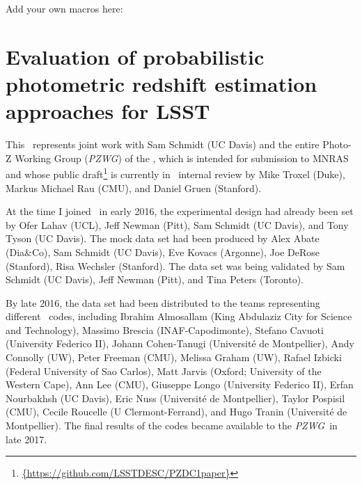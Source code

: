 \renewcommand{\chapid}{pzdc1}


 Add your own macros here:

\newcommand{\kids}{\project{KiDS}}
\newcommand{\hsc}{\project{HSC}}
\newcommand{\wfirst}{\project{WFIRST}}
\newcommand{\buzz}{\project{Buzzard}}
\newcommand{\pzwg}{\textit{PZWG}}

\newcommand{\chisq}{$\chi^{2}$}

\newcommand{\pzcode}[1]{\texttt{#1}}
\newcommand{\annz}{\pzcode{ANNz2}}
\newcommand{\bpz}{\pzcode{BPz}}
\newcommand{\cmnn}{\pzcode{CMNN}}
\newcommand{\delight}{\pzcode{Delight}}
\newcommand{\eazy}{\pzcode{EAZY}}
\newcommand{\flexzboost}{\pzcode{FlexZBoost}}
\newcommand{\gpz}{\pzcode{GPz}}
\newcommand{\lephare}{\pzcode{LePhare}}
\newcommand{\metaphor}{\pzcode{METAPhoR}}
\newcommand{\skynet}{\pzcode{SkyNet}}
\newcommand{\tpz}{\pzcode{TPZ}}
\newcommand{\trainz}{\pzcode{trainZ}}
\def\X{{\mathbf{X}}}
\def\x{{\mathbf{x}}}
\def\E{{\mathbb{E}}}

\chapter{ Evaluation of probabilistic photometric redshift estimation approaches for \textsc{LSST}}

This \paper\ represents joint work with Sam Schmidt (UC Davis) and the entire Photo-Z Working Group (\pzwg) of the \desc, which is intended for submission to MNRAS and whose public draft\footnote{\url{{https://github.com/LSSTDESC/PZDC1paper}}} is currently in \desc\ internal review by Mike Troxel (Duke), Markus Michael Rau (CMU), and Daniel Gruen (Stanford).

At the time I joined \desc\ in early 2016, the experimental design had already been set by Ofer Lahav (UCL), Jeff Newman (Pitt), Sam Schmidt (UC Davis), and Tony Tyson (UC Davis).
The mock data set had been produced by Alex Abate (Dia\&Co), Sam Schmidt (UC Davis), Eve Kovacs (Argonne), Joe DeRose (Stanford), Risa Wechsler (Stanford).
The data set was being validated by Sam Schmidt (UC Davis), Jeff Newman (Pitt), and Tina Peters (Toronto).

By late 2016, the data set had been distributed to the teams representing different \pzpdf\ codes, including Ibrahim Almosallam (King Abdulaziz City for Science and Technology), Massimo Brescia (INAF-Capodimonte), Stefano Cavuoti (University Federico II), Johann Cohen-Tanugi (Universit\'e de Montpellier),  Andy Connolly (UW), Peter Freeman (CMU), Melissa Graham (UW), Rafael Izbicki (Federal University of Sao Carlos), Matt Jarvis (Oxford; University of the Western Cape), Ann Lee (CMU), Giuseppe Longo (University Federico II), Erfan Nourbakhsh (UC Davis), Eric Nuss (Universit\'e de Montpellier), Taylor Pospisil (CMU), Cecile Roucelle (U Clermont-Ferrand), and Hugo Tranin (Universit\'e de Montpellier).
The final results of the codes became available to the \pzwg\ in late 2017.

